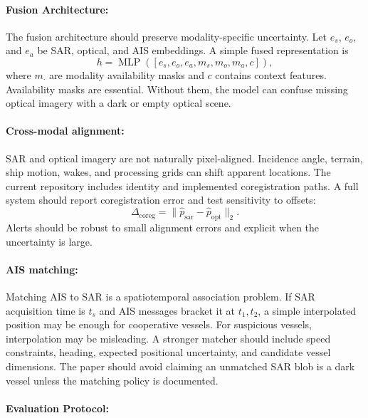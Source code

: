 \documentclass{article}
\begin{document}
\paragraph{Fusion Architecture:}

The fusion architecture should preserve modality-specific uncertainty. Let $e_s$, $e_o$, and $e_a$ be SAR, optical, and AIS embeddings. A simple fused representation is
\begin{equation}
  h = \operatorname{MLP}([e_s,e_o,e_a,m_s,m_o,m_a,c]),
\end{equation}
where $m_{\cdot}$ are modality availability masks and $c$ contains context features. Availability masks are essential. Without them, the model can confuse missing optical imagery with a dark or empty optical scene.

\paragraph{Cross-modal alignment:}

SAR and optical imagery are not naturally pixel-aligned. Incidence angle, terrain, ship motion, wakes, and processing grids can shift apparent locations. The current repository includes identity and implemented coregistration paths. A full system should report coregistration error and test sensitivity to offsets:
\begin{equation}
  \Delta_{\text{coreg}}=\|\hat{p}_{\text{sar}}-\hat{p}_{\text{opt}}\|_2.
\end{equation}
Alerts should be robust to small alignment errors and explicit when the uncertainty is large.

\paragraph{AIS matching:}

Matching AIS to SAR is a spatiotemporal association problem. If SAR acquisition time is $t_s$ and AIS messages bracket it at $t_1,t_2$, a simple interpolated position may be enough for cooperative vessels. For suspicious vessels, interpolation may be misleading. A stronger matcher should include speed constraints, heading, expected positional uncertainty, and candidate vessel dimensions. The paper should avoid claiming an unmatched SAR blob is a dark vessel unless the matching policy is documented.

\paragraph{Evaluation Protocol:}
\end{document}
